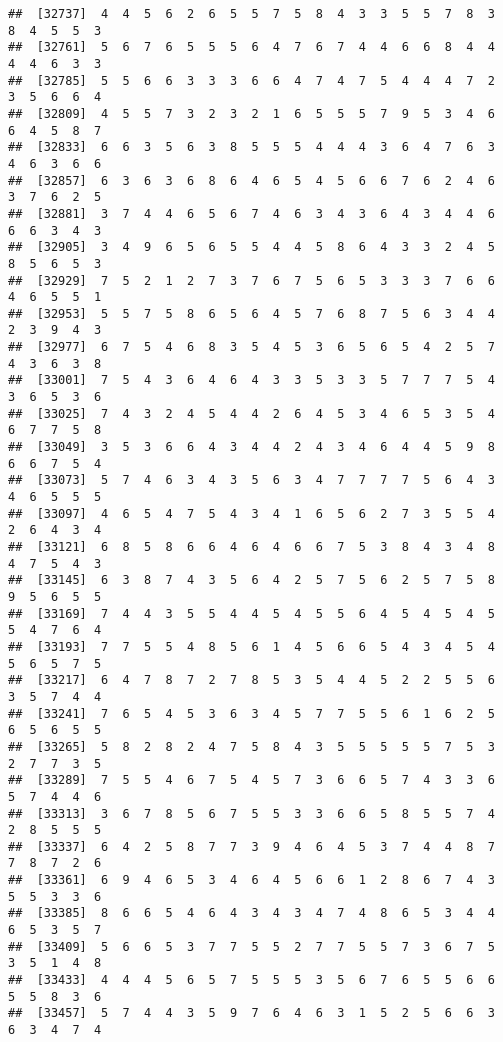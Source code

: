 \documentclass[
]{book}
\begin{document}
\begin{verbatim}
##  [32737]  4  4  5  6  2  6  5  5  7  5  8  4  3  3  5  5  7  8  3  8  4  5  5  3
##  [32761]  5  6  7  6  5  5  5  6  4  7  6  7  4  4  6  6  8  4  4  4  4  6  3  3
##  [32785]  5  5  6  6  3  3  3  6  6  4  7  4  7  5  4  4  4  7  2  3  5  6  6  4
##  [32809]  4  5  5  7  3  2  3  2  1  6  5  5  5  7  9  5  3  4  6  6  4  5  8  7
##  [32833]  6  6  3  5  6  3  8  5  5  5  4  4  4  3  6  4  7  6  3  4  6  3  6  6
##  [32857]  6  3  6  3  6  8  6  4  6  5  4  5  6  6  7  6  2  4  6  3  7  6  2  5
##  [32881]  3  7  4  4  6  5  6  7  4  6  3  4  3  6  4  3  4  4  6  6  6  3  4  3
##  [32905]  3  4  9  6  5  6  5  5  4  4  5  8  6  4  3  3  2  4  5  8  5  6  5  3
##  [32929]  7  5  2  1  2  7  3  7  6  7  5  6  5  3  3  3  7  6  6  4  6  5  5  1
##  [32953]  5  5  7  5  8  6  5  6  4  5  7  6  8  7  5  6  3  4  4  2  3  9  4  3
##  [32977]  6  7  5  4  6  8  3  5  4  5  3  6  5  6  5  4  2  5  7  4  3  6  3  8
##  [33001]  7  5  4  3  6  4  6  4  3  3  5  3  3  5  7  7  7  5  4  3  6  5  3  6
##  [33025]  7  4  3  2  4  5  4  4  2  6  4  5  3  4  6  5  3  5  4  6  7  7  5  8
##  [33049]  3  5  3  6  6  4  3  4  4  2  4  3  4  6  4  4  5  9  8  6  6  7  5  4
##  [33073]  5  7  4  6  3  4  3  5  6  3  4  7  7  7  7  5  6  4  3  4  6  5  5  5
##  [33097]  4  6  5  4  7  5  4  3  4  1  6  5  6  2  7  3  5  5  4  2  6  4  3  4
##  [33121]  6  8  5  8  6  6  4  6  4  6  6  7  5  3  8  4  3  4  8  4  7  5  4  3
##  [33145]  6  3  8  7  4  3  5  6  4  2  5  7  5  6  2  5  7  5  8  9  5  6  5  5
##  [33169]  7  4  4  3  5  5  4  4  5  4  5  5  6  4  5  4  5  4  5  5  4  7  6  4
##  [33193]  7  7  5  5  4  8  5  6  1  4  5  6  6  5  4  3  4  5  4  5  6  5  7  5
##  [33217]  6  4  7  8  7  2  7  8  5  3  5  4  4  5  2  2  5  5  6  3  5  7  4  4
##  [33241]  7  6  5  4  5  3  6  3  4  5  7  7  5  5  6  1  6  2  5  6  5  6  5  5
##  [33265]  5  8  2  8  2  4  7  5  8  4  3  5  5  5  5  5  7  5  3  2  7  7  3  5
##  [33289]  7  5  5  4  6  7  5  4  5  7  3  6  6  5  7  4  3  3  6  5  7  4  4  6
##  [33313]  3  6  7  8  5  6  7  5  5  3  3  6  6  5  8  5  5  7  4  2  8  5  5  5
##  [33337]  6  4  2  5  8  7  7  3  9  4  6  4  5  3  7  4  4  8  7  7  8  7  2  6
##  [33361]  6  9  4  6  5  3  4  6  4  5  6  6  1  2  8  6  7  4  3  5  5  3  3  6
##  [33385]  8  6  6  5  4  6  4  3  4  3  4  7  4  8  6  5  3  4  4  6  5  3  5  7
##  [33409]  5  6  6  5  3  7  7  5  5  2  7  7  5  5  7  3  6  7  5  3  5  1  4  8
##  [33433]  4  4  4  5  6  5  7  5  5  5  3  5  6  7  6  5  5  6  6  5  5  8  3  6
##  [33457]  5  7  4  4  3  5  9  7  6  4  6  3  1  5  2  5  6  6  3  6  3  4  7  4

\end{verbatim}
\end{document}
